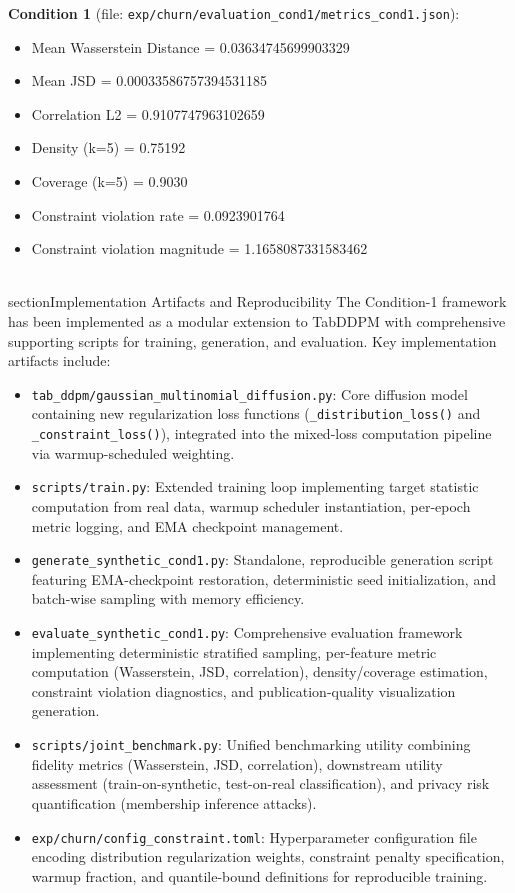 \documentclass[10pt,conference,a4paper]{IEEEtran}
\begin{document}
\textbf{Condition 1} (file: \texttt{exp/churn/evaluation\_cond1/metrics\_cond1.json}):
\begin{itemize}
    \item Mean Wasserstein Distance = 0.03634745699903329
    \item Mean JSD = 0.00033586757394531185
    \item Correlation L2 = 0.9107747963102659
    \item Density (k=5) = 0.75192
    \item Coverage (k=5) = 0.9030
    \item Constraint violation rate = 0.0923901764
    \item Constraint violation magnitude = 1.1658087331583462
\end{itemize}

\\section{Implementation Artifacts and Reproducibility}
The Condition-1 framework has been implemented as a modular extension to TabDDPM with comprehensive supporting scripts for training, generation, and evaluation. Key implementation artifacts include:
\begin{itemize}
    \item \texttt{tab\_ddpm/gaussian\_multinomial\_diffusion.py}: Core diffusion model containing new regularization loss functions (\texttt{\_distribution\_loss()} and \texttt{\_constraint\_loss()}), integrated into the mixed-loss computation pipeline via warmup-scheduled weighting.
    \item \texttt{scripts/train.py}: Extended training loop implementing target statistic computation from real data, warmup scheduler instantiation, per-epoch metric logging, and EMA checkpoint management.
    \item \texttt{generate\_synthetic\_cond1.py}: Standalone, reproducible generation script featuring EMA-checkpoint restoration, deterministic seed initialization, and batch-wise sampling with memory efficiency.
    \item \texttt{evaluate\_synthetic\_cond1.py}: Comprehensive evaluation framework implementing deterministic stratified sampling, per-feature metric computation (Wasserstein, JSD, correlation), density/coverage estimation, constraint violation diagnostics, and publication-quality visualization generation.
    \item \texttt{scripts/joint\_benchmark.py}: Unified benchmarking utility combining fidelity metrics (Wasserstein, JSD, correlation), downstream utility assessment (train-on-synthetic, test-on-real classification), and privacy risk quantification (membership inference attacks).
    \item \texttt{exp/churn/config\_constraint.toml}: Hyperparameter configuration file encoding distribution regularization weights, constraint penalty specification, warmup fraction, and quantile-bound definitions for reproducible training.
\end{itemize}
\end{document}
